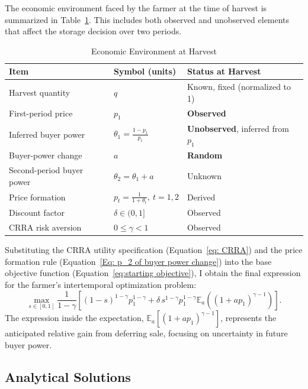 \noindent The economic environment faced by the farmer at the time of harvest is summarized in Table~\ref{tab:baseline model parameter table}. This includes both observed and unobserved elements that affect the storage decision over two periods.

\begin{table}[H]
\centering
\caption{Economic Environment at Harvest}
\label{tab:baseline model parameter table}
\begin{tabular}{lll}
\toprule
\textbf{Item} & \textbf{Symbol (units)} & \textbf{Status at Harvest} \\
\midrule
Harvest quantity & $q$ & Known, fixed (normalized to 1) \\
First-period price & $p_1$ & \textbf{Observed} \\
Inferred buyer power & $\theta_1 = \frac{1 - p_1}{p_1}$ & \textbf{Unobserved}, inferred from $p_1$ \\
Buyer-power change & $a$ & \textbf{Random} \\
Second-period buyer power & $\theta_2 = \theta_1 + a$ & Unknown \\
Price formation & $p_t = \frac{1}{1 + \theta_t},\ t=1,2$ & Derived \\
Discount factor & $\delta \in (0,1]$ & Observed \\
CRRA risk aversion & $0 \leq \gamma < 1$ & Observed \\
\bottomrule
\end{tabular}
\end{table}

\noindent Substituting the CRRA utility specification (Equation~\ref{eq: CRRA}) and the price formation rule (Equation~\ref{Eq: p_2 of buyer power change}) into the base objective function (Equation~\ref{eq:starting objective}), I obtain the final expression for the farmer’s intertemporal optimization problem:
\begin{equation}
\label{eq:final_objective}
\max_{s \in [0,1]} \frac{1}{1-\gamma} \left[ (1-s)^{1-\gamma} p_1^{1-\gamma} + \delta\, s^{1-\gamma} p_1^{1-\gamma} \mathbb{E}_a\left( (1 + a p_1)^{\gamma-1} \right)\right].
\end{equation}
\noindent The expression inside the expectation, $\mathbb{E}_a[(1 + a p_1)^{\gamma - 1}]$, represents the anticipated relative gain from deferring sale, focusing on uncertainty in future buyer power.

\subsection{Analytical Solutions}

